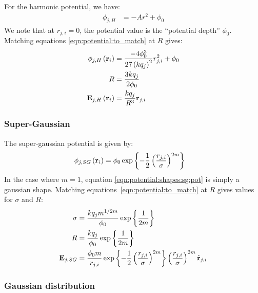 For the harmonic potential, we have:
\begin{align}
\phi_{j,H} & = -A r^2 + \phi_0
\end{align}
We note that at $r_{j,i} = 0$, the potential value is the ``potential depth''
$\phi_0$.
Matching equations \eqref{eqn:potential:to_match} at $R$ gives:
\begin{subequations}
\begin{align}
\phi_{j,H}\left( \textbf{r}_i \right) & = \frac{-4 \phi_0^3}{27 \left( k q_j \right)^2} r_{j,i}^2 + \phi_0
\\
R & = \frac{3 k q_j}{2 \phi_0} \\
\textbf{E}_{j,H}\left( \textbf{r}_i \right) & = \frac{k q_j}{R^3} \textbf{r}_{j,i}
\end{align}
\end{subequations}


\subsubsection{Super-Gaussian}

The super-gaussian potential is given by:
\begin{align}
\phi_{j,SG}\left( \textbf{r}_i \right) & = \phi_0 \exp{ \left\{ 
                            -\frac{1}{2} \left( \frac{r_{j,i}}{\sigma} \right)^{2m}
                         \right\}}
\label{eqn:potential:shapes:sg:pot}
\end{align}
In the case where $m = 1$, equation \eqref{eqn:potential:shapes:sg:pot} is simply
a gaussian shape. Matching equations~\eqref{eqn:potential:to_match} at $R$ gives
values for $\sigma$ and $R$:
\begin{subequations}
\begin{align}
\sigma  & = \frac{k q_j m^{1/2m}}{\phi_0} \exp{ \left\{ \frac{1}{2m} \right\}} \\
R       & = \frac{k q_j}{\phi_0} \exp{ \left\{ \frac{1}{2m} \right\}} \\
\textbf{E}_{j,SG} & = \frac{\phi_0 m}{r_{j,i}}
                \exp{ \left\{ -\frac{1}{2} \left( \frac{r_{j,i}}{\sigma} \right)^{2m} \right\}}
                \left(  \frac{r_{j,i}}{\sigma}  \right)^{2m}
                \hat{\textbf{r}}_{j,i}
\end{align}
\label{eqn:potential:shapes:sg}
\end{subequations}





\subsubsection{Gaussian distribution}

